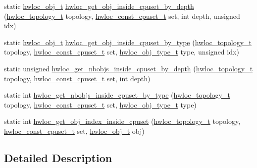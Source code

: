 \begin{DoxyCompactItemize}
\item 
static \hyperlink{a00185_ga79b8ab56877ef99ac59b833203391c7d}{hwloc\+\_\+obj\+\_\+t} \hyperlink{a00195_gaec86f1f88832836e3f9338e246ea5862}{hwloc\+\_\+get\+\_\+obj\+\_\+inside\+\_\+cpuset\+\_\+by\+\_\+depth} (\hyperlink{a00186_ga9d1e76ee15a7dee158b786c30b6a6e38}{hwloc\+\_\+topology\+\_\+t} topology, \hyperlink{a00183_ga1f784433e9b606261f62d1134f6a3b25}{hwloc\+\_\+const\+\_\+cpuset\+\_\+t} set, int depth, unsigned idx)
\item 
static \hyperlink{a00185_ga79b8ab56877ef99ac59b833203391c7d}{hwloc\+\_\+obj\+\_\+t} \hyperlink{a00195_ga2edf924e5a0cca9cb22f65cc77c6ddb5}{hwloc\+\_\+get\+\_\+obj\+\_\+inside\+\_\+cpuset\+\_\+by\+\_\+type} (\hyperlink{a00186_ga9d1e76ee15a7dee158b786c30b6a6e38}{hwloc\+\_\+topology\+\_\+t} topology, \hyperlink{a00183_ga1f784433e9b606261f62d1134f6a3b25}{hwloc\+\_\+const\+\_\+cpuset\+\_\+t} set, \hyperlink{a00184_gacd37bb612667dc437d66bfb175a8dc55}{hwloc\+\_\+obj\+\_\+type\+\_\+t} type, unsigned idx)
\item 
static unsigned \hyperlink{a00195_gaa43c64512ddb33fd181990c4261cec7d}{hwloc\+\_\+get\+\_\+nbobjs\+\_\+inside\+\_\+cpuset\+\_\+by\+\_\+depth} (\hyperlink{a00186_ga9d1e76ee15a7dee158b786c30b6a6e38}{hwloc\+\_\+topology\+\_\+t} topology, \hyperlink{a00183_ga1f784433e9b606261f62d1134f6a3b25}{hwloc\+\_\+const\+\_\+cpuset\+\_\+t} set, int depth)
\item 
static int \hyperlink{a00195_ga133c40415de008518608f8bff52a5ab9}{hwloc\+\_\+get\+\_\+nbobjs\+\_\+inside\+\_\+cpuset\+\_\+by\+\_\+type} (\hyperlink{a00186_ga9d1e76ee15a7dee158b786c30b6a6e38}{hwloc\+\_\+topology\+\_\+t} topology, \hyperlink{a00183_ga1f784433e9b606261f62d1134f6a3b25}{hwloc\+\_\+const\+\_\+cpuset\+\_\+t} set, \hyperlink{a00184_gacd37bb612667dc437d66bfb175a8dc55}{hwloc\+\_\+obj\+\_\+type\+\_\+t} type)
\item 
static int \hyperlink{a00195_ga4c3a20d61e9beb06c667b21688c772c5}{hwloc\+\_\+get\+\_\+obj\+\_\+index\+\_\+inside\+\_\+cpuset} (\hyperlink{a00186_ga9d1e76ee15a7dee158b786c30b6a6e38}{hwloc\+\_\+topology\+\_\+t} topology, \hyperlink{a00183_ga1f784433e9b606261f62d1134f6a3b25}{hwloc\+\_\+const\+\_\+cpuset\+\_\+t} set, \hyperlink{a00185_ga79b8ab56877ef99ac59b833203391c7d}{hwloc\+\_\+obj\+\_\+t} obj)
\end{DoxyCompactItemize}


\subsection{Detailed Description}


